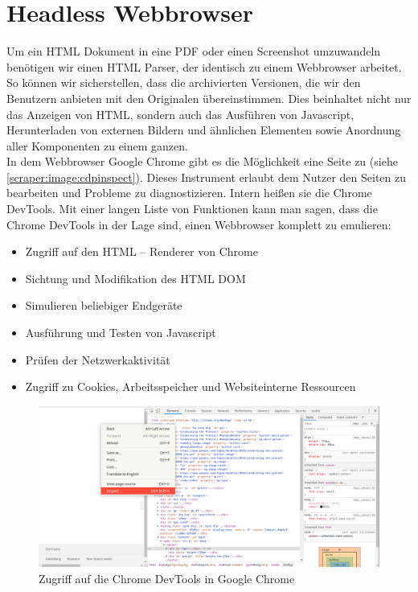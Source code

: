 \section{Headless Webbrowser} \label{scraper:sec:headless}
Um ein HTML Dokument in eine PDF oder einen Screenshot umzuwandeln benötigen wir einen HTML Parser, der identisch zu einem Webbrowser arbeitet. So können wir sicherstellen, dass die archivierten Versionen, die wir den Benutzern anbieten mit den Originalen übereinstimmen. Dies beinhaltet nicht nur das Anzeigen von HTML, sondern auch das Ausführen von Javascript, Herunterladen von externen Bildern und ähnlichen Elementen sowie Anordnung aller Komponenten zu einem ganzen. \\
In dem Webbrowser Google Chrome gibt es die Möglichkeit eine Seite zu  (siehe \autoref{scraper:image:cdpinspect}). Dieses Instrument erlaubt dem Nutzer den Seiten zu bearbeiten und Probleme zu diagnostizieren. Intern heißen sie die Chrome DevTools. Mit einer langen Liste von Funktionen kann man sagen, dass die Chrome DevTools in der Lage sind, einen Webbrowser komplett zu emulieren:
\begin{itemize}
	\item Zugriff auf den HTML – Renderer von Chrome
	\item Sichtung und Modifikation des \ac{HTML DOM}
	\item Simulieren beliebiger Endgeräte
	\item Ausführung und Testen von Javascript
	\item Prüfen der Netzwerkaktivität
	\item Zugriff zu Cookies, Arbeitsspeicher und Websiteinterne Ressourcen
\end{itemize}


\begin{figure}[h]
	\centering
	\includegraphics[width=\linewidth]{images/cdp_inspect.png}
	\caption{Zugriff auf die Chrome DevTools in Google Chrome}
	\label{scraper:image:cdpinspect}
\end{figure}

